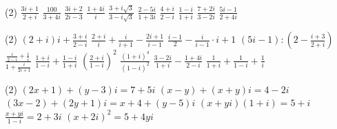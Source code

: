 \documentclass[12pt,a4paper]{article}
\begin{document}
\begin{exercise}
    \begin{tasks}(2)
        \task $\displaystyle \frac{3i+1}{2+i}$
        \task $\displaystyle \frac{100}{3+4i}$
        \task $\displaystyle \frac{3i+2}{2i-3}$
        \task $\displaystyle \frac{1+4i}{i}$
        \task $\displaystyle \frac{3+i\sqrt{3}}{3-i\sqrt{3}}$
        \task $\displaystyle \frac{2-5i}{1+3i}$
        \task $\displaystyle \frac{4+i}{2-i}$
        \task $\displaystyle \frac{1-i}{1+i}$
        \task $\displaystyle \frac{7+2i}{3-2i}$
        \task $\displaystyle \frac{5i-1}{2+4i}$
    \end{tasks}
\end{exercise}


\begin{exercise}[Upravte]
    \begin{tasks}(2)
        \task $\displaystyle (2+i)i+\frac{3+i}{2-i}$
        \task $\displaystyle \frac{2+i}{i}+\frac{i}{i+1}-\frac{2i+1}{i-1}$
        \task $\displaystyle \frac{i-1}{2}-\frac{i}{i-1}\cdot i+1$
        \task $\displaystyle (5i-1):\left(2-\frac{i+3}{2+i}\right)$
        \task $\displaystyle \frac{\frac{i}{2-i}+\frac1i}{1+\frac{i}{2i+1}}$
        \task $\displaystyle \frac{1+i}{1-i}+\frac{1-i}{1+i}$
        \task $\displaystyle \left(\frac{2+i}{1-i}\right)^2$
        \task $\displaystyle \frac{(1+i)^4}{(1-i)^2}$
        \task $\displaystyle \frac{3-2i}{1+i}-\frac{1+4i}{2-i}$
        \task $\displaystyle \frac{1}{1+i}+\frac{1}{1-i}+\frac{1}{i}$
    \end{tasks}
\end{exercise}


\begin{exercise}
        \begin{tasks}(2)
            \task $(2x+1)+(y-3)i=7+5i$
            \task $(x-y)+(x+y)i=4-2i$
            \task $(3x-2)+(2y+1)i=x+4+(y-5)i$
            \task $(x+yi)(1+i)=5+i$
            \task $\displaystyle \frac{x+yi}{1-i}=2+3i$
            \task $(x+2i)^2=5+4yi$
        \end{tasks}
\end{exercise}
\end{document}
